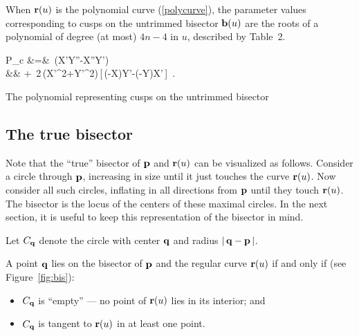 When ${\bf r}(u)$
is the polynomial curve (\ref{polycurve}), 
the parameter values corresponding
to cusps on the untrimmed bisector ${\bf b}(u)$
are the roots of a polynomial of degree (at most) $4n-4$ in $u$, described
by Table~2.

\begin{table*}
\ba \label{Pcusp}
P_c \! &=& \,(X'Y''-X''Y') \nonumber \\
&& +\ 2\,({X'}^2+{Y'}^2)\,[\,(\alpha-X)Y'-(\beta-Y)X'\,] \,.
\ea
\label{tabc}
\caption{The polynomial representing cusps on the untrimmed bisector}
\end{table*}

\subsection{The true bisector}

Note that the ``true'' bisector of ${\bf p}$ and ${\bf r}
(u)$ can be visualized as follows. Consider a circle through ${\bf p}$,
increasing in size until it just touches the curve ${\bf r}(u)$. Now
consider all such circles, inflating in all directions from ${\bf p}$
until they touch ${\bf r}(u)$. The bisector is the locus of the centers
of these maximal circles. In the next section, it is useful to
keep this representation of the bisector in mind.

\begin{dfn}
\label{d:Cq}
Let $C_{\bf q}$ denote the circle with center ${\bf q}$ and radius
$|\,{\bf q}-{\bf p}\,|$.
\end{dfn}


\begin{rmk}
\label{rmk:bis}
{\rm
A point ${\bf q}$ lies on the bisector of ${\bf p}$ and the regular
curve ${\bf r}(u)$ if and only if (see Figure~\ref{fig:bis}):
\begin{itemize}
\item
$C_{\bf q}$ is ``empty'' --- no point of ${\bf r}(u)$ lies in its
interior; and
\item
$C_{\bf q}$ is tangent to ${\bf r}(u)$ in at least one point.
\end{itemize}
}
\end{rmk}

